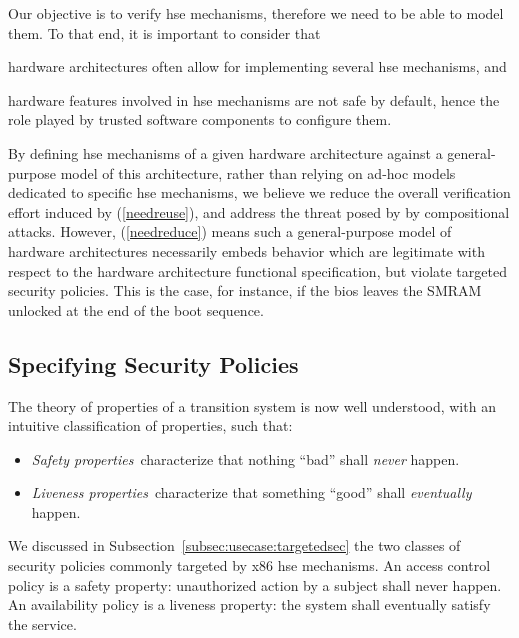 Our objective is to verify \ac{hse} mechanisms, therefore we need to be able to
model them.
%
To that end, it is important to consider that
%
\begin{inparaenum}[(1)]
\item \label{needreuse}%
  hardware architectures often allow for implementing several \ac{hse}
  mechanisms, and
\item \label{needreduce}%
  hardware features involved in \ac{hse} mechanisms are not safe by default,
  hence the role played by trusted software components to configure them.
\end{inparaenum}
%
By defining \ac{hse} mechanisms of a given hardware architecture against a
general-purpose model of this architecture, rather than relying on ad-hoc models
dedicated to specific \ac{hse} mechanisms, we believe we reduce the overall
verification effort induced by (\ref{needreuse}), and address the threat posed
by by compositional attacks.
%
However, (\ref{needreduce}) means such a general-purpose model of hardware
architectures necessarily embeds behavior which are legitimate with respect to
the hardware architecture functional specification, but violate targeted
security policies.
%
This is the case, for instance, if the \ac{bios} leaves the SMRAM unlocked at
the end of the boot sequence.

\subsection{Specifying Security Policies}
\label{subsec:sota:security}

The theory of properties of a transition system is now well understood, with an
intuitive classification of properties, such that:
%
\begin{itemize}
\item \emph{Safety properties}\,\cite{lamport1977proving,lamport1985logical}
  characterize that nothing ``bad'' shall \emph{never} happen.
\item \emph{Liveness properties}\,\cite{lamport1985logical,alpern1985liveness}
  characterize that something ``good'' shall \emph{eventually} happen.
\end{itemize}

We discussed in Subsection~\ref{subsec:usecase:targetedsec} the two classes of
security policies commonly targeted by x86 \ac{hse} mechanisms.
%
An access control policy is a safety property: unauthorized action by a subject
shall never happen.
%
An availability policy is a liveness property: the system shall eventually
satisfy the service.

